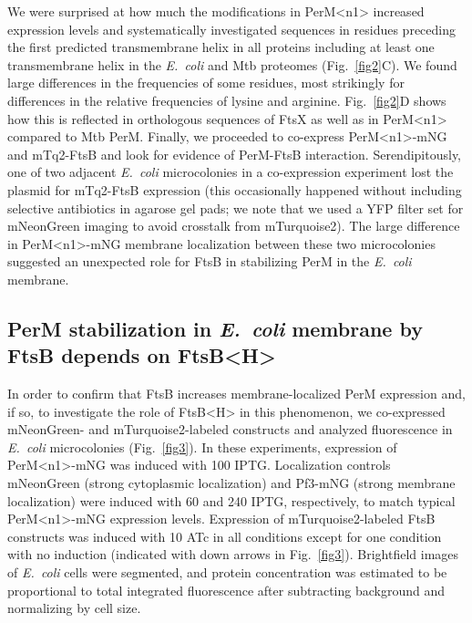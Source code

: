 \documentclass[twocolumn,pdflatex,sn-nature]{sn-jnl}%
\def\textsuperscript#1{<#1>}%
\newcommand\ec{\textit{E.~coli}}
\newcommand\mtb{Mtb}
\newcommand\ftsbH{FtsB\textsuperscript{H}}
\newcommand\permN{PerM\textsuperscript{n1}}
\begin{document}
We were surprised at how much the modifications in \permN{} increased expression levels and systematically investigated sequences in residues preceding the first predicted transmembrane helix in all proteins including at least one transmembrane helix in the \ec{} and \mtb{} proteomes (Fig.~\ref{fig2}C).
We found large differences in the frequencies of some residues, most strikingly for differences in the relative frequencies of lysine and arginine. Fig.~\ref{fig2}D shows how this is reflected in orthologous sequences of FtsX as well as in \permN{} compared to \mtb{} PerM.
Finally, we proceeded to co-express \permN{}-mNG and mTq2-FtsB and look for evidence of PerM-FtsB interaction.
Serendipitously, one of two adjacent \ec{} microcolonies in a co-expression experiment lost the plasmid for mTq2-FtsB expression (this occasionally happened without including selective antibiotics in agarose gel pads; we note that we used a YFP filter set for mNeonGreen imaging to avoid crosstalk from mTurquoise2).
The large difference in \permN{}-mNG membrane localization between these two microcolonies suggested an unexpected role for FtsB in stabilizing PerM in the \ec{} membrane.

\subsection{PerM stabilization in \ec{} membrane by FtsB depends on \ftsbH{}}

In order to confirm that FtsB increases membrane-localized PerM expression and, if so, to investigate the role of \ftsbH{} in this phenomenon, we co-expressed mNeonGreen- and mTurquoise2-labeled constructs and analyzed fluorescence in \ec{} microcolonies (Fig.~\ref{fig3}).
In these experiments, expression of \permN{}-mNG was induced with \qty{100}{\uM} IPTG. Localization controls mNeonGreen (strong cytoplasmic localization) and Pf3-mNG (strong membrane localization) were induced with \qty{60}{\uM} and \qty{240}{\uM} IPTG, respectively, to match typical \permN{}-mNG expression levels.
Expression of mTurquoise2-labeled FtsB constructs was induced with \qty{10}{\nM} ATc in all conditions except for one condition with no induction (indicated with down arrows in Fig.~\ref{fig3}).
Brightfield images of \ec{} cells were segmented, and protein concentration was estimated to be proportional to total integrated fluorescence after subtracting background and normalizing by cell size.
\end{document}
